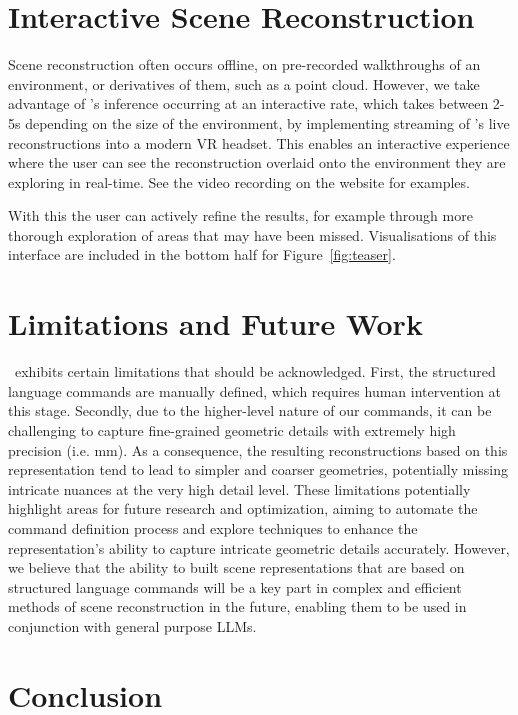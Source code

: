 \section{Interactive Scene Reconstruction}

Scene reconstruction often occurs offline, on pre-recorded walkthroughs of an environment, or derivatives of them, such as a point cloud. 
However, we take advantage of \METHOD's inference occurring at an interactive rate, which takes between 2-5s depending on the size of the environment, by implementing streaming of \METHOD's live reconstructions into a modern VR headset. This enables an interactive experience where the user can see the reconstruction overlaid onto the environment they are exploring in real-time. See the video recording 
on the website
for examples.

With this the user can actively refine the results, for example through more thorough exploration of areas that may have been missed. Visualisations of this interface are included in the bottom half for Figure~\ref{fig:teaser}.


\section{Limitations and Future Work}
\label{section:limitations_future_work}

\METHOD~exhibits certain limitations that should be acknowledged. First, the structured language commands are manually defined, which requires human intervention at this stage. Secondly, due to the higher-level nature of our commands, it can be challenging to capture fine-grained geometric details with extremely high precision (i.e. mm). As a consequence, the resulting reconstructions based on this representation tend to lead to simpler and coarser geometries, potentially missing intricate nuances at the very high detail level. 
These limitations potentially highlight areas for future research and optimization, aiming to automate the command definition process and explore techniques to enhance the representation's ability to capture intricate geometric details accurately. However, we believe that the ability to built scene representations that are based on structured language commands will be a key part in complex and efficient methods of scene reconstruction in the future, enabling them to be used in conjunction with general purpose LLMs.

\section{Conclusion}
\label{section:conclusion}

